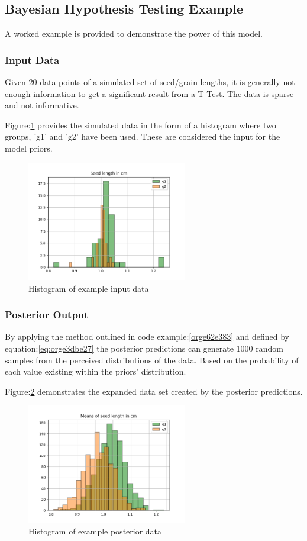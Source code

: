 \documentclass[11pt]{report}
\begin{document}
\subsection{Bayesian Hypothesis Testing Example}
\label{sec:org3a1e808}
A worked example is provided to demonstrate the power of this model.
\subsubsection{Input Data}
\label{sec:orgac48621}
Given 20 data points of a simulated set of seed/grain lengths, it is generally not enough information to get a significant result from a T-Test. The data is sparse and not informative.

Figure:\ref{fig:orgba2ccfb} provides the simulated data in the form of a histogram where two groups, 'g1' and 'g2' have been used. These are considered the input for the model priors.
\begin{figure}[htbp]
\centering
\includegraphics[width=7cm]{./images/exampledata.png}
\caption{\label{fig:orgba2ccfb}
Histogram of example input data}
\end{figure}

\subsubsection{Posterior Output}
\label{sec:org15acaae}
By applying the method outlined in code example:\ref{orge62e383} and defined by equation:\ref{eq:orge3dbe27} the posterior predictions can generate 1000 random samples from the perceived distributions of the data. Based on the probability of each value existing within the priors' distribution.

Figure:\ref{fig:orgddebf07} demonstrates the expanded data set created by the posterior predictions.
\begin{figure}[htbp]
\centering
\includegraphics[width=7cm]{./images/examplebayes.png}
\caption{\label{fig:orgddebf07}
Histogram of example posterior data}
\end{figure}
\end{document}
